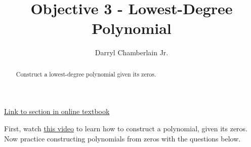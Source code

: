 \documentclass{ximera}
\author{Darryl Chamberlain Jr.}
\title{Objective 3 - Lowest-Degree Polynomial}
\begin{document}
\begin{abstract}
Construct a lowest-degree polynomial given its zeros.
\end{abstract}
\maketitle

\href{https://cnx.org/contents/mwjClAV_@8.1:G7V9LHif@17/Zeros-of-Polynomial-Functions}{Link to section in online textbook}


First, watch \underline{\href{https://mediasite.video.ufl.edu/Mediasite/Play/11f054fdc9db465fba9fe468237d117f1d}{this video}} to learn how to construct a polynomial, given its zeros. Now practice constructing polynomials from zeros with the questions below.
\end{document}
